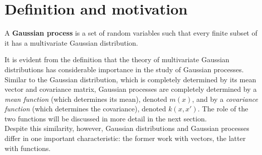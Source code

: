 \newpage


\section{Definition and motivation}


\begin{defi}
  A \textbf{Gaussian process} is a set of random variables such that every finite subset of it has a multivariate Gaussian distribution.
\end{defi}

It is evident from the definition that the theory of multivariate Gaussian distributions has considerable importance in the study of Gaussian processes.\\
Similar to the Gaussian distribution, which is completely determined by its mean vector and covariance matrix, Gaussian processes are completely determined by a \textit{mean function} (which determines its mean), denoted $m(x)$, and by a \textit{covariance function} (which determines the covariance), denoted $k(x,x')$. The role of the two functions will be discussed in more detail in the next section.\\
Despite this similarity, however, Gaussian distributions and Gaussian processes differ in one important characteristic: the former work with vectors, the latter with functions.

\vspace{0.5cm}

